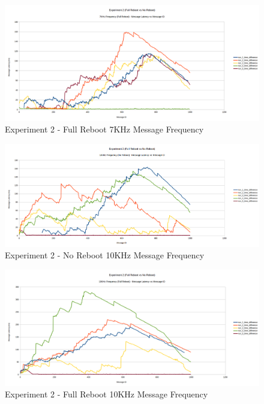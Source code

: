 \documentclass{l4proj}
\begin{document}
\begin{appendices}
\begin{figure}
\centering
\includegraphics[width=\textwidth]{images/full-reboot-7khz.png}
\caption{Experiment 2 - Full Reboot 7KHz Message Frequency}
\label{exp2-fullreboot-7khz}
\end{figure}

\begin{figure}
\centering
\includegraphics[width=\textwidth]{images/no-reboot-10khz.png}
\caption{Experiment 2 - No Reboot 10KHz Message Frequency}
\label{exp2-noreboot-10khz}
\end{figure}

\begin{figure}
\centering
\includegraphics[width=\textwidth]{images/full-reboot-10khz.png}
\caption{Experiment 2 - Full Reboot 10KHz Message Frequency}
\label{exp2-fullreboot-10khz}
\end{figure}


\end{appendices}
\end{document}
